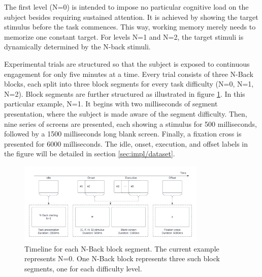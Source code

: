 The first level (N=0) is intended to impose no particular cognitive load on the subject besides requiring sustained attention. It is achieved by showing the target stimulus before the task commences. This way, working memory merely needs to memorize one constant target. For levels N=1 and N=2, the target stimuli is dynamically determined by the N-back stimuli.

Experimental trials are structured so that the subject is exposed to continuous engagement for only five minutes at a time. Every trial consists of three N-Back blocks, each split into three block segments for every task difficulty (N=0, N=1, N=2). Block segments are further structured as illustrated in figure \ref{fig:impl_NBackBlockSeg}. In this particular example, N=1. It begins with two milliseconds of segment presentation, where the subject is made aware of the segment difficulty. Then, nine series of screens are presented, each showing a stimulus for 500 milliseconds, followed by a 1500 milliseconds long blank screen. Finally, a fixation cross is presented for 6000 milliseconds. The idle, onset, execution, and offset labels in the figure will be detailed in section \ref{sec:impl/dataset}.


\begin{figure}[h]
    \centering
    \includegraphics[width=0.8\textwidth]{figures/impl_NBackBlock.png}
    \caption{Timeline for each N-Back block segment. The current example represents N=0. One N-Back block represents three such block segments, one for each difficulty level.}
    \label{fig:impl_NBackBlockSeg}
\end{figure}


